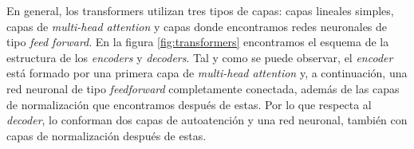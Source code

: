 \documentclass[11pt,spanish,listoffigures,listoftables]{tfgetsinf}
\begin{document}
En general, los transformers utilizan tres tipos de capas: capas lineales simples, capas de \textit{multi-head attention} y capas donde encontramos redes neuronales de tipo \textit{feed forward}. En la figura \ref{fig:transformers} encontramos el esquema de la estructura de los \textit{encoders} y  \textit{decoders}. Tal y como se puede observar, el \textit{encoder} está formado por una primera capa de \textit{multi-head attention} y, a continuación, una red neuronal de tipo \textit{feedforward} completamente conectada, además de las capas de normalización que encontramos después de estas. Por lo que respecta al \textit{decoder}, lo conforman dos capas de autoatención y una red neuronal, también con capas de normalización después de estas. \cite{jurafsky2023speech, multiheaddotproduct}

\begin{figure}[h]
    \centering
\end{figure}
\end{document}
